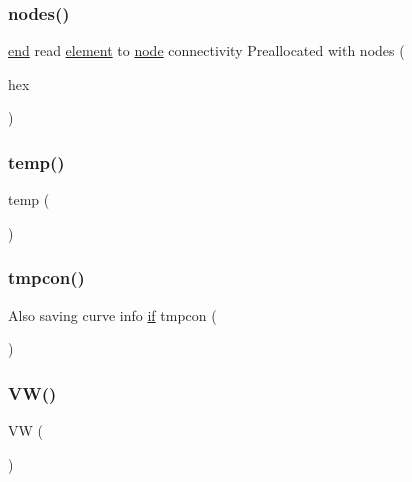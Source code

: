 \subsubsection{\texorpdfstring{nodes()}{nodes()}}
{\footnotesize\ttfamily \hyperlink{a00608_afb358f48b1646c750fb9da6c6585be2b}{end} read \hyperlink{a00611_a4998e7f4989562d1ed06579e07265c30}{element} to \hyperlink{a00611_adf51fe9945b6ca147057cc27ff639d0f}{node} connectivity Preallocated with nodes (\begin{DoxyParamCaption}\item[{cubic}]{hex }\end{DoxyParamCaption})}

\mbox{\label{a00608_a66be333d3079c1ecfec40ed090608507}} 
\subsubsection{\texorpdfstring{temp()}{temp()}}
{\footnotesize\ttfamily temp (\begin{DoxyParamCaption}\item[{\hyperlink{a00608_afb6aca53df96564f2adf086c942453ec}{i}}]{ }\end{DoxyParamCaption})}

\mbox{\label{a00608_ac90fbb5b14a3c144a13164ba8eff726a}} 
\subsubsection{\texorpdfstring{tmpcon()}{tmpcon()}}
{\footnotesize\ttfamily Also saving curve info \hyperlink{a00614_a96c738d3e2120c4273f9d4390761d99e}{if} tmpcon (\begin{DoxyParamCaption}\item[{2}]{ }\end{DoxyParamCaption})}

\mbox{\label{a00608_a279fc4bc04d1e6cb4941402ba6e29874}} 
\subsubsection{\texorpdfstring{V\+W()}{VW()}}
{\footnotesize\ttfamily VW (\begin{DoxyParamCaption}\item[{\hyperlink{a00608_afb6aca53df96564f2adf086c942453ec}{i}}]{ }\end{DoxyParamCaption})}

